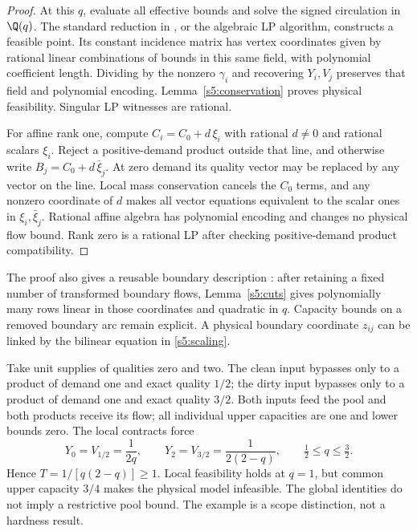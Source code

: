 \begin{proof}
At this $q$, evaluate all effective bounds and solve the signed
circulation in $\Q(q)$. The standard reduction in
\citet[Corollary~11.3a, p.~176]{s5:schrijver2003}, or the algebraic LP
algorithm, constructs a feasible point. Its constant incidence matrix
has vertex coordinates given by rational linear combinations of bounds
in this same field, with polynomial coefficient length. Dividing by
the nonzero $\gamma_i$ and recovering $Y_i,V_j$ preserves that field
and polynomial encoding. Lemma~\ref{s5:conservation} proves physical
feasibility. Singular LP witnesses are rational.

For affine rank one, compute $C_i=C_0+d\,\xi_i$ with rational
$d\ne0$ and rational scalars $\xi_i$. Reject a positive-demand product
outside that line, and otherwise write $B_j=C_0+d\,\bar\xi_j$.
At zero demand its quality vector may be replaced by any vector on the
line. Local mass conservation cancels the $C_0$ terms, and any nonzero
coordinate of $d$ makes all vector equations equivalent to the scalar
ones in $\xi_i,\bar\xi_j$. Rational affine algebra has polynomial
encoding and changes no physical flow bound. Rank zero is a rational
LP after checking positive-demand product compatibility.
\end{proof}

The proof also gives a reusable boundary description
\label{s5:fixed-boundary}: after retaining a fixed number of transformed
boundary flows, Lemma~\ref{s5:cuts} gives polynomially many rows linear
in those coordinates and quadratic in $q$. Capacity bounds on a removed
boundary arc remain explicit. A physical boundary coordinate $z_{ij}$
can be linked by the bilinear equation in \eqref{s5:scaling}.

\begin{example}
\label{s5:capacity-counterexample}
Take unit supplies of qualities zero and two. The clean input bypasses
only to a product of demand one and exact quality $1/2$; the dirty input
bypasses only to a product of demand one and exact quality $3/2$.
Both inputs feed the pool and both products receive its flow; all
individual upper capacities are one and lower bounds zero. The local
contracts force
\[
 Y_0=V_{1/2}=\frac1{2q},\qquad
 Y_2=V_{3/2}=\frac1{2(2-q)},\qquad \tfrac12\le q\le\tfrac32.
\]
Hence $T=1/[q(2-q)]\ge1$. Local feasibility holds at $q=1$, but common
upper capacity $3/4$ makes the physical model infeasible. The global
identities do not imply a restrictive pool bound. The example is a
scope distinction, not a hardness result.
\end{example}

